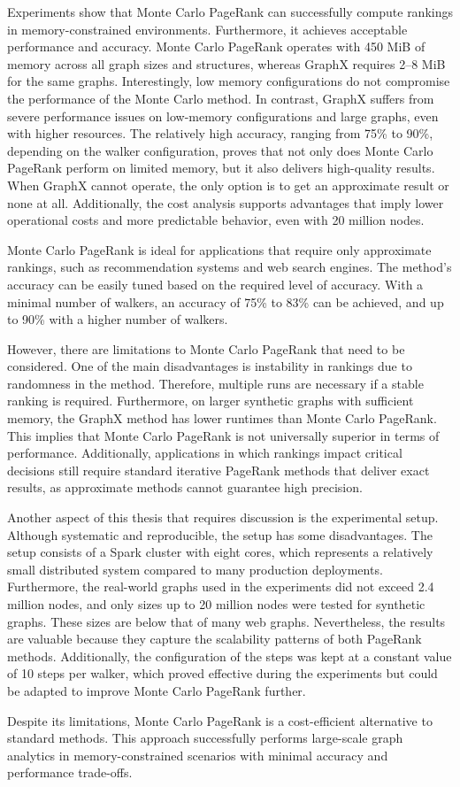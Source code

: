 Experiments show that Monte Carlo PageRank can successfully compute rankings in memory-constrained environments. Furthermore, it achieves acceptable performance and accuracy. Monte Carlo PageRank operates with 450 MiB of memory across all graph sizes and structures, whereas GraphX requires 2–8 MiB for the same graphs. Interestingly, low memory configurations do not compromise the performance of the Monte Carlo method. In contrast, GraphX suffers from severe performance issues on low-memory configurations and large graphs, even with higher resources. The relatively high accuracy, ranging from 75\% to 90\%, depending on the walker configuration, proves that not only does Monte Carlo PageRank perform on limited memory, but it also delivers high-quality results. When GraphX cannot operate, the only option is to get an approximate result or none at all. Additionally, the cost analysis supports advantages that imply lower operational costs and more predictable behavior, even with 20 million nodes. \par

Monte Carlo PageRank is ideal for applications that require only approximate rankings, such as recommendation systems and web search engines. The method's accuracy can be easily tuned based on the required level of accuracy. With a minimal number of walkers, an accuracy of 75\% to 83\% can be achieved, and up to 90\% with a higher number of walkers. \par  

However, there are limitations to Monte Carlo PageRank that need to be considered. One of the main disadvantages is instability in rankings due to randomness in the method. Therefore, multiple runs are necessary if a stable ranking is required. Furthermore, on larger synthetic graphs with sufficient memory, the GraphX method has lower runtimes than Monte Carlo PageRank. This implies that Monte Carlo PageRank is not universally superior in terms of performance. Additionally, applications in which rankings impact critical decisions still require standard iterative PageRank methods that deliver exact results, as approximate methods cannot guarantee high precision. \par

Another aspect of this thesis that requires discussion is the experimental setup. Although systematic and reproducible, the setup has some disadvantages. The setup consists of a Spark cluster with eight cores, which represents a relatively small distributed system compared to many production deployments. Furthermore, the real-world graphs used in the experiments did not exceed 2.4 million nodes, and only sizes up to 20 million nodes were tested for synthetic graphs. These sizes are below that of many web graphs. Nevertheless, the results are valuable because they capture the scalability patterns of both PageRank methods. Additionally, the configuration of the steps was kept at a constant value of 10 steps per walker, which proved effective during the experiments but could be adapted to improve Monte Carlo PageRank further.\par

Despite its limitations, Monte Carlo PageRank is a cost-efficient alternative to standard methods. This approach successfully performs large-scale graph analytics in memory-constrained scenarios with minimal accuracy and performance trade-offs.



